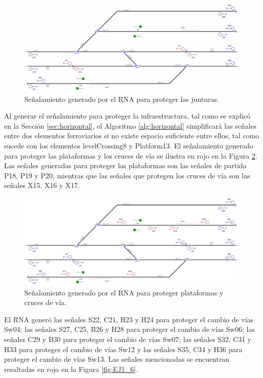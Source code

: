 	\begin{figure}[H]
		\centering
		\includegraphics[width=1\textwidth]{resultados-obtenidos/ejemplo1/images/1_step2.png}
		\centering\caption{Señalamiento generado por el RNA para proteger las junturas.}
		\label{fig:EJ1_4}
	\end{figure}
	
	Al generar el señalamiento para proteger la infraestructura, tal como se explicó en la Sección \ref{sec:horizontal}, el Algoritmo \ref{alg:horizontal} simplificará las señales entre dos elementos ferroviarios si no existe espacio suficiente entre ellos, tal como sucede con los elementos levelCrossing8 y Platform13. El señalamiento generado para proteger las plataformas y los cruces de vía se ilustra en rojo en la Figura \ref{fig:EJ1_5}. Las señales generadas para proteger las plataformas son las señales de partida P18, P19 y P20, mientras que las señales que protegen los cruces de vía son las señales X15, X16 y X17.
		
	\begin{figure}[H]
		\centering
		\includegraphics[width=1\textwidth]{resultados-obtenidos/ejemplo1/images/1_step3.png}
		\centering\caption{Señalamiento generado por el RNA para proteger plataformas y cruces de vía.}
		\label{fig:EJ1_5}
	\end{figure}
	
	El RNA generó las señales S22, C21, H23 y H24 para proteger el cambio de vías Sw04; las señales S27, C25, B26 y H28 para proteger el cambio de vías Sw06; las señales C29 y B30 para proteger el cambio de vías Sw07; las señales S32, C31 y H33 para proteger el cambio de vías Sw12 y las señales S35, C34 y H36 para proteger el cambio de vías Sw13. Las señales mencionadas se encuentran resaltadas en rojo en la Figura \ref{fig:EJ1_6}.
	
